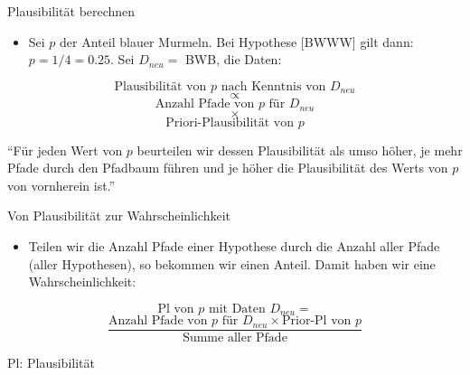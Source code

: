 \documentclass[
  ngerman,
  ignorenonframetext,
]{beamer}
\providecommand{\tightlist}{%
  \setlength{\itemsep}{0pt}\setlength{\parskip}{0pt}}
\begin{document}
\begin{frame}{Plausibilität berechnen}
\protect\hypertarget{plausibilituxe4t-berechnen}{}
\begin{itemize}
\tightlist
\item
  Sei \(p\) der Anteil blauer Murmeln. Bei Hypothese {[}BWWW{]} gilt
  dann: \(p=1/4 = 0.25\). Sei \(D_{neu} =\) BWB, die Daten:
\end{itemize}

\[\text{Plausibilität von }p\text{ nach Kenntnis von }D_{neu}\]
\[\propto\] \[\text{Anzahl Pfade von }p\text{ für }D_{neu}\] \[\times\]
\[\text{Priori-Plausibilität von }p\]

``Für jeden Wert von \(p\) beurteilen wir dessen Plausibilität als umso
höher, je mehr Pfade durch den Pfadbaum führen und je höher die
Plausibilität des Werts von \(p\) von vornherein ist.''
\end{frame}

\begin{frame}{Von Plausibilität zur Wahrscheinlichkeit}
\protect\hypertarget{von-plausibilituxe4t-zur-wahrscheinlichkeit}{}
\begin{itemize}
\tightlist
\item
  Teilen wir die Anzahl Pfade einer Hypothese durch die Anzahl aller
  Pfade (aller Hypothesen), so bekommen wir einen Anteil. Damit haben
  wir eine Wahrscheinlichkeit:
\end{itemize}

\[\text{Pl von }p\text{ mit Daten }D_{neu} =\]
\[\frac{\text{Anzahl Pfade von }p\text{ für }D_{neu}\times \text{Prior-Pl von }p}{\text{Summe aller Pfade}}\]

Pl: Plausibilität
\end{frame}
\end{document}
